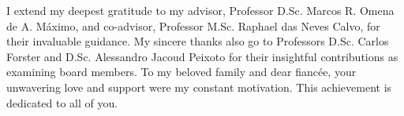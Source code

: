 I extend my deepest gratitude to my advisor, Professor D.Sc. Marcos R. Omena de A. Máximo, and co-advisor, Professor M.Sc. Raphael das Neves Calvo, for their invaluable guidance. My sincere thanks also go to Professors D.Sc. Carlos Forster and D.Sc. Alessandro Jacoud Peixoto for their insightful contributions as examining board members. To my beloved family and dear fiancée, your unwavering love and support were my constant motivation. This achievement is dedicated to all of you.